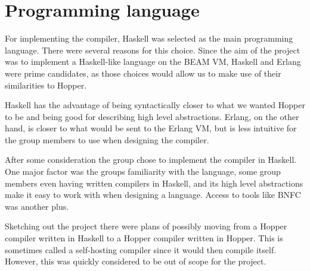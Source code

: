 \section{Programming language}



For implementing the compiler, Haskell was selected as the main programming language. There were several reasons for this choice. Since the aim of the project was to implement a Haskell-like language on the BEAM VM, Haskell and Erlang were prime candidates, as those choices would allow us to make use of their similarities to Hopper. 

Haskell has the advantage of being syntactically closer to what we wanted Hopper to be and being good for describing high level abstractions. Erlang, on the other hand, is closer to what would be sent to the Erlang VM, but is less intuitive for the group members to use when designing the compiler.


After some consideration the group chose to implement the compiler in Haskell. One major factor was the groups familiarity with the language, some group members even having written compilers in Haskell, and its high level abstractions make it easy to work with when designing a language. Access to tools like BNFC was another plus.

Sketching out the project there were plans of possibly moving from a Hopper compiler written in Haskell to a Hopper compiler written in Hopper. This is sometimes called a self-hosting compiler since it would then compile itself. However, this was quickly considered to be out of scope for the project.

